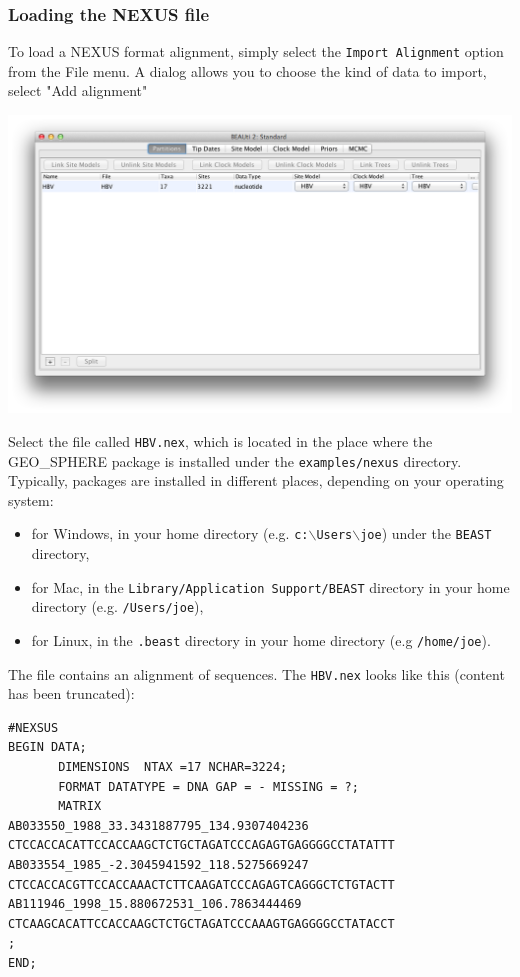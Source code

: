 \documentclass{article}
\def\beast-geo{GEO\_SPHERE}
\begin{document}
\subsubsection*{Loading the NEXUS file }

To load a NEXUS format alignment, simply select the \texttt{Import Alignment} option from the File menu. A dialog allows you to choose the kind of data to import, select "Add alignment"

\includegraphics[scale=0.4]{figures/BEAUti_DataPartitions}

Select the file called \texttt{HBV.nex}, which is located in the place where the \beast-geo{} package is installed 
under the {\tt examples/nexus} directory. Typically, packages are installed in different places, depending on your operating system:
\begin{itemize}
\item for Windows, in your home directory (e.g. {\tt c:$\backslash$Users$\backslash$joe}) under the {\tt BEAST} directory,
\item for Mac, in the {\tt Library/Application Support/BEAST} directory in your home directory (e.g. {\tt /Users/joe}),
\item for Linux, in the {\tt .beast} directory in your home directory (e.g {\tt /home/joe}).
\end{itemize}
The file contains an alignment of sequences. The \texttt{HBV.nex} looks like this (content has been truncated):

\begin{verbatim}
#NEXSUS
BEGIN DATA;
       DIMENSIONS  NTAX =17 NCHAR=3224;
       FORMAT DATATYPE = DNA GAP = - MISSING = ?;
       MATRIX   
AB033550_1988_33.3431887795_134.9307404236		CTCCACCACATTCCACCAAGCTCTGCTAGATCCCAGAGTGAGGGGCCTATATTT
AB033554_1985_-2.3045941592_118.5275669247		CTCCACCACGTTCCACCAAACTCTTCAAGATCCCAGAGTCAGGGCTCTGTACTT
AB111946_1998_15.880672531_106.7863444469		CTCAAGCACATTCCACCAAGCTCTGCTAGATCCCAAAGTGAGGGGCCTATACCT
;
END;
\end{verbatim}
\end{document}

